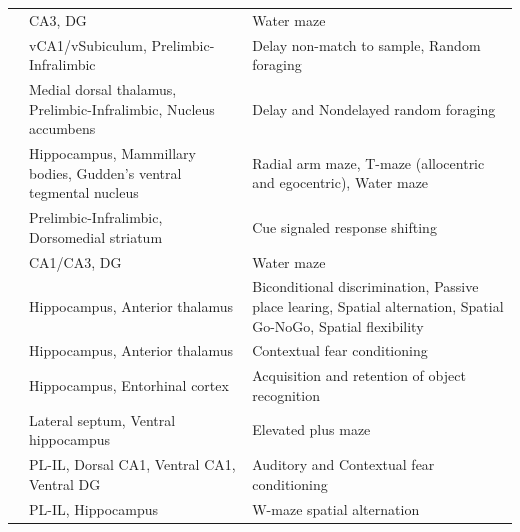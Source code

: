 \documentclass[doc, longtable]{apa6}
\begin{document}
\begin{landscape}
\begin{longtable}{p{8cm}p{5cm}p{8cm}}
\cite{lassalle2000reversible} & CA3, \newline DG & Water maze\\[20pt]
\cite{floresco1997selective} & vCA1/vSubiculum, \newline Prelimbic-Infralimbic & Delay non-match to sample, \newline Random foraging \\[20pt]
\cite{Floresco11061}& Medial dorsal  thalamus, \newline Prelimbic-Infralimbic, \newline Nucleus accumbens & Delay and Nondelayed random foraging \\[20pt]
\cite{vann2013dismantling} & Hippocampus, \newline Mammillary bodies, \newline Gudden's ventral tegmental nucleus & Radial arm maze, \newline T-maze (allocentric and egocentric), \newline Water maze \\[20pt]
\cite{baker2014contralateral} & Prelimbic-Infralimbic, \newline Dorsomedial striatum & Cue signaled response shifting\\[20pt]
\cite{pecs1998lateralized} & CA1/CA3, \newline DG & Water maze\\[20pt]
\cite{dumont2015impact} & Hippocampus, \newline Anterior thalamus & Biconditional discrimination, \newline Passive place learing, \newline Spatial alternation, \newline Spatial Go-NoGo, \newline Spatial flexibility \\[20pt]
\cite{maren1997electrolytic} & Hippocampus, \newline Anterior thalamus & Contextual fear conditioning \\[20pt]
\cite{Vnek3193} & Hippocampus, \newline Entorhinal cortex & Acquisition and retention of object recognition\\[20pt]
\cite{trent2010ventral} & Lateral septum, \newline Ventral hippocampus & Elevated plus maze\\[20pt]
\cite{fu2016region} & PL-IL, \newline Dorsal CA1, \newline Ventral CA1, \newline Ventral DG & Auditory and Contextual fear conditioning \\[20pt]
\cite{dai2017contralateral} & PL-IL, \newline Hippocampus & W-maze spatial alternation\\[20pt]
\hline
\end{longtable}
\end{landscape}

\printbibliography
\end{document}
